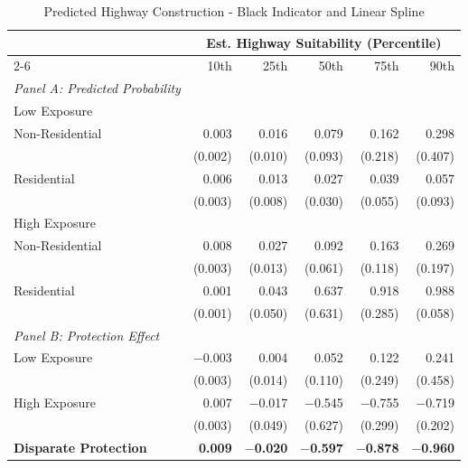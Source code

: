 \begin{table}[h]
\centering
\caption{Predicted Highway Construction - Black Indicator and Linear Spline}
\label{tab:predicted_outcomes/black_share_sweep_logitinteraction_anyblack}
\begin{threeparttable}
\begin{tabular*}{1\textwidth}{@{\extracolsep{\fill}}lr@{\hspace{1.2em}}r@{\hspace{1.2em}}r@{\hspace{1.2em}}r@{\hspace{1.2em}}r@{\hspace{1.2em}}}
\toprule
 & \multicolumn{5}{c}{Est. Highway Suitability (Percentile)} \\
\cmidrule(l){2-6}
 & 10th & 25th & 50th & 75th & 90th \\
\midrule
\textit{Panel A: Predicted Probability} & & & & & \\
\addlinespace[2pt]
Low Exposure & & & & & \\
\quad Non-Residential & 0.003 & 0.016 & 0.079 & 0.162 & 0.298 \\
 & (0.002) & (0.010) & (0.093) & (0.218) & (0.407) \\[4pt]
\quad Residential & 0.006 & 0.013 & 0.027 & 0.039 & 0.057 \\
 & (0.003) & (0.008) & (0.030) & (0.055) & (0.093) \\[4pt]
High Exposure & & & & & \\
\quad Non-Residential & 0.008 & 0.027 & 0.092 & 0.163 & 0.269 \\
 & (0.003) & (0.013) & (0.061) & (0.118) & (0.197) \\[4pt]
\quad Residential & 0.001 & 0.043 & 0.637 & 0.918 & 0.988 \\
 & (0.001) & (0.050) & (0.631) & (0.285) & (0.058) \\[4pt]
\midrule
\textit{Panel B: Protection Effect} & & & & & \\
\addlinespace[2pt]
Low Exposure & $-$0.003 & 0.004 & 0.052 & 0.122 & 0.241 \\
 & (0.003) & (0.014) & (0.110) & (0.249) & (0.458) \\[4pt]
High Exposure & 0.007\rlap{$^{**}$} & $-$0.017 & $-$0.545 & $-$0.755\rlap{$^{**}$} & $-$0.719\rlap{$^{***}$} \\
 & (0.003) & (0.049) & (0.627) & (0.299) & (0.202) \\[4pt]
\addlinespace[2pt]
\textbf{Disparate Protection} & \textbf{0.009}\rlap{$^{***}$} & \textbf{$-$0.020} & \textbf{$-$0.597} & \textbf{$-$0.878}\rlap{$^{**}$} & \textbf{$-$0.960} \\

\end{tabular*}
\end{threeparttable}
\end{table}
